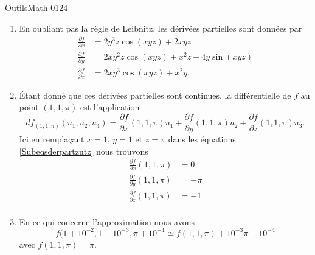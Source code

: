 
\begin{corrige}{OutilsMath-0124}

    \begin{enumerate}
        \item
            En oubliant pas la règle de Leibnitz, les dérivées partielles sont données par
            \begin{subequations}        \label{Subeqsderpartzutz}
                \begin{align}
                    \frac{ \partial f }{ \partial x }&=2y^3z\cos(xyz)+2xyz\\
                    \frac{ \partial f }{ \partial y }&=2xy^2z\cos(xyz)+x^2z+4y\sin(xyz)\\
                    \frac{ \partial f }{ \partial z }&=2xy^3\cos(xyz)+x^2y.
                \end{align}
            \end{subequations}
        \item 
            Étant donné que ces dérivées partielles sont continues, la différentielle de \( f\) au point \( (1,1,\pi)\) est l'application
            \begin{equation}
                df_{(1,1,\pi)}(u_1,u_2,u_4)=\frac{ \partial f }{ \partial x }(1,1,\pi)u_1+\frac{ \partial f }{ \partial y }(1,1,\pi)u_2+\frac{ \partial f }{ \partial z }(1,1,\pi)u_3.
            \end{equation}
            Ici en remplaçant \( x=1\), \( y=1\) et $z=\pi$ dans les équations \eqref{Subeqsderpartzutz} nous trouvons
            \begin{subequations}
                \begin{align}
                    \frac{ \partial f }{ \partial x }(1,1,\pi)&=0\\
                    \frac{ \partial f }{ \partial y }(1,1,\pi)&=-\pi\\
                    \frac{ \partial f }{ \partial z }(1,1,\pi)&=-1\\
                \end{align}
            \end{subequations}
        \item
            En ce qui concerne l'approximation nous avons
            \begin{equation}
                f(1+10^{-2},1-10^{-3},\pi+10^{-4}\simeq f(1,1,\pi)+10^{-3}\pi-10^{-4}
            \end{equation}
            avec \( f(1,1,\pi)=\pi\).
    \end{enumerate}

\end{corrige}
